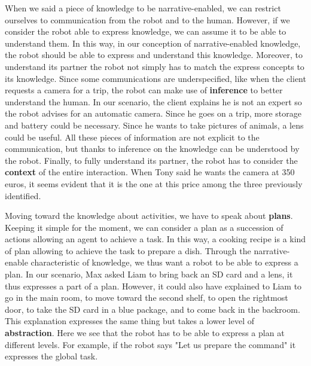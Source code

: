 When we said a piece of knowledge to be narrative-enabled, we can restrict ourselves to communication from the robot and to the human. However, if we consider the robot able to express knowledge, we can assume it to be able to understand them. In this way, in our conception of narrative-enabled knowledge, the robot should be able to express and understand this knowledge. Moreover, to understand its partner the robot not simply has to match the express concepts to its knowledge. Since some communications are underspecified, like when the client requests a camera for a trip, the robot can make use of \textbf{inference} to better understand the human. In our scenario, the client explains he is not an expert so the robot advises for an automatic camera. Since he goes on a trip, more storage and battery could be necessary. Since he wants to take pictures of animals, a lens could be useful. All these pieces of information are not explicit to the communication, but thanks to inference on the knowledge can be understood by the robot. Finally, to fully understand its partner, the robot has to consider the \textbf{context} of the entire interaction. When Tony said he wants the camera at 350 euros, it seems evident that it is the one at this price among the three previously identified.

Moving toward the knowledge about activities, we have to speak about \textbf{plans}. Keeping it simple for the moment, we can consider a plan as a succession of actions allowing an agent to achieve a task. In this way, a cooking recipe is a kind of plan allowing to achieve the task to prepare a dish. Through the narrative-enable characteristic of knowledge, we thus want a robot to be able to express a plan. In our scenario, Max asked Liam to bring back an SD card and a lens, it thus expresses a part of a plan. However, it could also have explained to Liam to go in the main room, to move toward the second shelf, to open the rightmost door, to take the SD card in a blue package, and to come back in the backroom. This explanation expresses the same thing but takes a lower level of \textbf{abstraction}. Here we see that the robot has to be able to express a plan at different levels. For example, if the robot says "Let us prepare the command" it expresses the global task.

